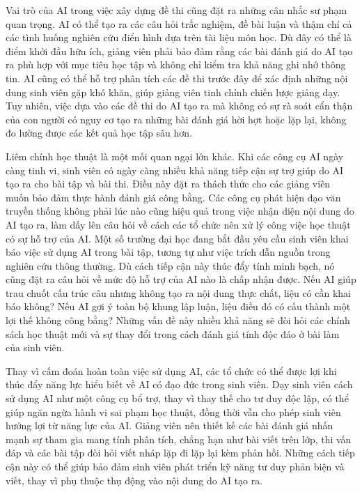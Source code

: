 Vai trò của AI trong việc xây dựng đề thi cũng đặt ra những cân nhắc sư phạm quan trọng. AI có thể tạo ra các câu hỏi trắc nghiệm, đề bài luận và thậm chí cả các tình huống nghiên cứu điển hình dựa trên tài liệu môn học. Dù đây có thể là điểm khởi đầu hữu ích, giảng viên phải bảo đảm rằng các bài đánh giá do AI tạo ra phù hợp với mục tiêu học tập và không chỉ kiểm tra khả năng ghi nhớ thông tin. AI cũng có thể hỗ trợ phân tích các đề thi trước đây để xác định những nội dung sinh viên gặp khó khăn, giúp giảng viên tinh chỉnh chiến lược giảng dạy. Tuy nhiên, việc dựa vào các đề thi do AI tạo ra mà không có sự rà soát cẩn thận của con người có nguy cơ tạo ra những bài đánh giá hời hợt hoặc lặp lại, không đo lường được các kết quả học tập sâu hơn.

Liêm chính học thuật là một mối quan ngại lớn khác. Khi các công cụ AI ngày càng tinh vi, sinh viên có ngày càng nhiều khả năng tiếp cận sự trợ giúp do AI tạo ra cho bài tập và bài thi. Điều này đặt ra thách thức cho các giảng viên muốn bảo đảm thực hành đánh giá công bằng. Các công cụ phát hiện đạo văn truyền thống không phải lúc nào cũng hiệu quả trong việc nhận diện nội dung do AI tạo ra, làm dấy lên câu hỏi về cách các tổ chức nên xử lý công việc học thuật có sự hỗ trợ của AI. Một số trường đại học đang bắt đầu yêu cầu sinh viên khai báo việc sử dụng AI trong bài tập, tương tự như việc trích dẫn nguồn trong nghiên cứu thông thường. Dù cách tiếp cận này thúc đẩy tính minh bạch, nó cũng đặt ra câu hỏi về mức độ hỗ trợ của AI nào là chấp nhận được. Nếu AI giúp trau chuốt cấu trúc câu nhưng không tạo ra nội dung thực chất, liệu có cần khai báo không? Nếu AI gợi ý toàn bộ khung lập luận, liệu điều đó có cấu thành một lợi thế không công bằng? Những vấn đề này nhiều khả năng sẽ đòi hỏi các chính sách học thuật mới và sự thay đổi trong cách đánh giá tính độc đáo ở bài làm của sinh viên.

Thay vì cấm đoán hoàn toàn việc sử dụng AI, các tổ chức có thể được lợi khi thúc đẩy năng lực hiểu biết về AI có đạo đức trong sinh viên. Dạy sinh viên cách sử dụng AI như một công cụ bổ trợ, thay vì thay thế cho tư duy độc lập, có thể giúp ngăn ngừa hành vi sai phạm học thuật, đồng thời vẫn cho phép sinh viên hưởng lợi từ năng lực của AI. Giảng viên nên thiết kế các bài đánh giá nhấn mạnh sự tham gia mang tính phân tích, chẳng hạn như bài viết trên lớp, thi vấn đáp và các bài tập đòi hỏi viết nháp lặp đi lặp lại kèm phản hồi. Những cách tiếp cận này có thể giúp bảo đảm sinh viên phát triển kỹ năng tư duy phản biện và viết, thay vì phụ thuộc thụ động vào nội dung do AI tạo ra.

